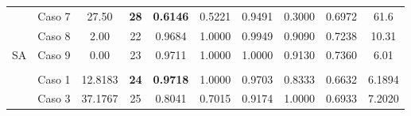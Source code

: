 \begin{table}[]
{\begin{tabular}{cccccccccc}
			\multicolumn{1}{c|}{}                      & Caso 7                        & 27.50                                                                & {\color[HTML]{9A0000} \textbf{28}}                                 & {\color[HTML]{9A0000} \textbf{0.6146}}                  & 0.5221                        & 0.9491                        & 0.3000                        & 0.6972                        & 61.6                                                                 \\
			\multicolumn{1}{c|}{}                      & {\color[HTML]{003532} Caso 8} & {\color[HTML]{003532} 2.00}                                          & {\color[HTML]{003532} 22}                                          & {\color[HTML]{003532} 0.9684}                           & {\color[HTML]{003532} 1.0000} & {\color[HTML]{003532} 0.9949} & {\color[HTML]{003532} 0.9090} & {\color[HTML]{003532} 0.7238} & {\color[HTML]{003532} 10.31}                                         \\
			\multicolumn{1}{c|}{\multirow{-8}{*}{SA}}  & Caso 9                        & 0.00                                                                 & 23                                                                 & 0.9711                                                  & 1.0000                        & 1.0000                        & 0.9130                        & 0.7360                        & 6.01                                                                 \\
			\multicolumn{10}{c}{}                                                                                                                                                                                                                                                                                                                                                                                                                                                                   \\
			\multicolumn{1}{c|}{}                      & {\color[HTML]{003532} Caso 1} & {\color[HTML]{003532} 12.8183}                                       & {\color[HTML]{9A0000} \textbf{24}}                                 & {\color[HTML]{9A0000} \textbf{0.9718}}                  & {\color[HTML]{003532} 1.0000} & {\color[HTML]{003532} 0.9703} & {\color[HTML]{003532} 0.8333} & {\color[HTML]{003532} 0.6632} & {\color[HTML]{003532} 6.1894}                                        \\
			\multicolumn{1}{c|}{}                      & Caso 3                        & 37.1767                                                              & 25                                                                 & 0.8041                                                  & 0.7015                        & 0.9174                        & 1.0000                        & 0.6933                        & 7.2020                                                               \\

\end{tabular}}
\end{table}
